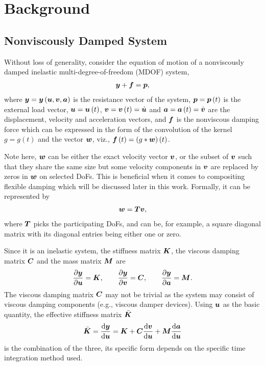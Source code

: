 \section{Background}
\subsection{Nonviscously Damped System}
Without loss of generality, consider the equation of motion of a nonviscously damped inelastic multi-degree-of-freedom (MDOF) system,
\begin{gather}\label{eq:eom}
\bm{y}+\bm{f}=\bm{p},
\end{gather}
where $\bm{y}=\bm{y}\left(\bm{u},\bm{v},\bm{a}\right)$ is the resistance vector of the system, $\bm{p}=\bm{p}\left(t\right)$ is the external load vector, $\bm{u}=\bm{u}\left(t\right)$, $\bm{v}=\bm{v}\left(t\right)=\dot{\bm{u}}$ and $\bm{a}=\bm{a}\left(t\right)=\dot{\bm{v}}$ are the displacement, velocity and acceleration vectors, and $\bm{f}$ is the nonviscous damping force which can be expressed in the form of the convolution of the kernel $g=g\left(t\right)$ and the vector $\bm{w}$, viz., $\bm{f}\left(t\right)=\left(g*\bm{w}\right)\left(t\right)$.

Note here, $\bm{w}$ can be either the exact velocity vector $\bm{v}$, or the subset of $\bm{v}$ such that they share the same size but some velocity components in $\bm{v}$ are replaced by zeros in $\bm{w}$ on selected DoFs. This is beneficial when it comes to compositing flexible damping which will be discussed later in this work. Formally, it can be represented by
\begin{gather}
\bm{w}=\bm{T}\bm{v},
\end{gather}
where $\bm{T}$ picks the participating DoFs, and can be, for example, a square diagonal matrix with its diagonal entries being either one or zero.

Since it is an inelastic system, the stiffness matrix $\bm{K}$, the viscous damping matrix $\bm{C}$ and the mass matrix $\bm{M}$ are
\begin{gather}
\dfrac{\partial{\bm{y}}}{\partial{\bm{u}}}=\bm{K},\qquad
\dfrac{\partial{\bm{y}}}{\partial{\bm{v}}}=\bm{C},\qquad
\dfrac{\partial{\bm{y}}}{\partial{\bm{a}}}=\bm{M}.
\end{gather}
The viscous damping matrix $\bm{C}$ may not be trivial as the system may consist of viscous damping components (e.g., viscous damper devices). Using $\bm{u}$ as the basic quantity, the effective stiffness matrix $\bar{\bm{K}}$
\begin{gather}
\bar{\bm{K}}=\dfrac{\mathrm{d}\bm{y}}{\mathrm{d}\bm{u}}=\bm{K}+\bm{C}\dfrac{\mathrm{d}\bm{v}}{\mathrm{d}\bm{u}}+\bm{M}\dfrac{\mathrm{d}\bm{a}}{\mathrm{d}\bm{u}}
\end{gather}
is the combination of the three, its specific form depends on the specific time integration method used.
